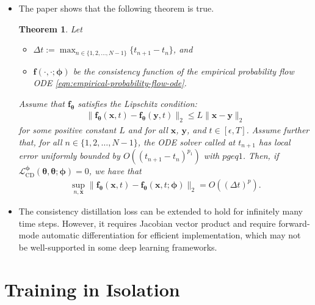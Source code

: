 \documentclass[10pt]{article}
\newtheorem{theorem}[lemma]{Theorem}
\newcommand{\ve}[1]{\mathbf{#1}}
\newcommand{\ves}[1]{\boldsymbol{#1}}
\newcommand{\mrm}[1]{\mathrm{#1}}
\newcommand{\mcal}[1]{\mathcal{#1}}
\begin{document}
\begin{itemize}
  \item The paper shows that the following theorem is true.
  \begin{theorem}
    Let 
    \begin{itemize}
      \item $\Delta t := \max_{n \in \{1, 2, \dotsc, N-1\}}\{ t_{n+1} - t_{n} \}$, and
      \item $\ve{f}(\cdot, \cdot; \ves{\phi})$ be the consistency function of the empirical probability flow ODE \eqref{eqn:empirical-probability-flow-ode}.
    \end{itemize}
    Assume that $\ve{f}_{\ves{\theta}}$ satisfies the Lipschitz condition:
    \begin{align*}
      \| \ve{f}_{\ves{\theta}}(\ve{x},t) - \ve{f}_{\ves{\theta}}(\ve{y},t) \|_2 \leq L \| \ve{x} - \ve{y} \|_2
    \end{align*}
    for some positive constant $L$ and for all $\ve{x}$, $\ve{y}$, and $t \in [\epsilon, T]$. Assume further that, for all $n \in \{ 1, 2, \dotsc, N-1 \}$, the ODE solver called at $t_{n+1}$ has local error uniformly bounded by $O((t_{n+1} - t_{n})^{p_1})$ with $p geq 1$. Then, if $\mcal{L}_{\mrm{CD}}^{\ves{\phi}}(\ves{\theta}, \ves{\theta}; \ves{\phi}) = 0$, we have that
    \begin{align*}
      \sup_{n,\ve{x}} \| \ve{f}_{\ves{\theta}}(\ve{x}, t) - \ve{f}_{\ves{\theta}}(\ve{x}, t; \ves{\phi}) \|_2 = O((\Delta t)^p).
    \end{align*}
  \end{theorem}

  \item The consistency distillation loss can be extended to hold for infinitely many time steps. However, it requires Jacobian vector product and require forward-mode automatic differentiation for efficient implementation, which may not be well-supported in some deep learning frameworks.
\end{itemize}

\section{Training in Isolation}
\end{document}
